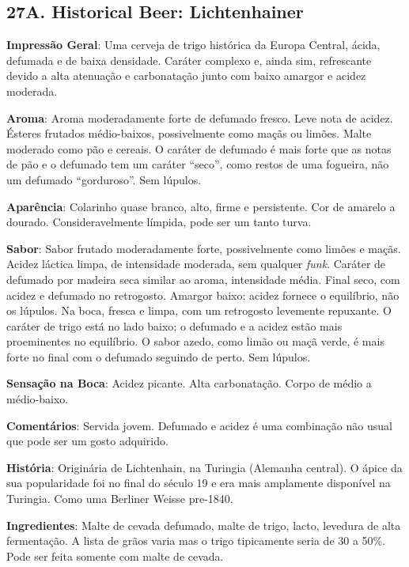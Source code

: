 \subsection*{27A. Historical Beer: Lichtenhainer}
\textbf{Impressão Geral}: Uma cerveja de trigo histórica da Europa Central, ácida, defumada e de baixa densidade. Caráter complexo e, ainda sim, refrescante devido a alta atenuação e carbonatação junto com baixo amargor e acidez moderada.

\textbf{Aroma}: Aroma moderadamente forte de defumado fresco. Leve nota de acidez. Ésteres frutados médio-baixos, possivelmente como maçãs ou limões. Malte moderado como pão e cereais. O caráter de defumado é mais forte que as notas de pão e o defumado tem um caráter “seco”, como restos de uma fogueira, não um defumado “gorduroso”. Sem lúpulos.

\textbf{Aparência}: Colarinho quase branco, alto, firme e persistente. Cor de amarelo a dourado. Consideravelmente límpida, pode ser um tanto turva.

\textbf{Sabor}: Sabor frutado moderadamente forte, possivelmente como limões e maçãs. Acidez láctica limpa, de intensidade moderada, sem qualquer \textit{funk}. Caráter de defumado por madeira seca similar ao aroma, intensidade média. Final seco, com acidez e defumado no retrogosto. Amargor baixo; acidez fornece o equilíbrio, não os lúpulos. Na boca, fresca e limpa, com um retrogosto levemente repuxante. O caráter de trigo está no lado baixo; o defumado e a acidez estão mais proeminentes no equilíbrio. O sabor azedo, como limão ou maçã verde, é mais forte no final com o defumado seguindo de perto. Sem lúpulos.

\textbf{Sensação na Boca}: Acidez picante. Alta carbonatação. Corpo de médio a médio-baixo.

\textbf{Comentários}: Servida jovem. Defumado e acidez é uma combinação não usual que pode ser um gosto adquirido.

\textbf{História}: Originária de Lichtenhain, na Turingia (Alemanha central). O ápice da sua popularidade foi no final do século 19 e era mais amplamente disponível na Turingia. Como uma Berliner Weisse pre-1840.

\textbf{Ingredientes}: Malte de cevada defumado, malte de trigo, lacto, levedura de alta fermentação. A lista de grãos varia mas o trigo tipicamente seria de 30 a 50\%. Pode ser feita somente com malte de cevada.

